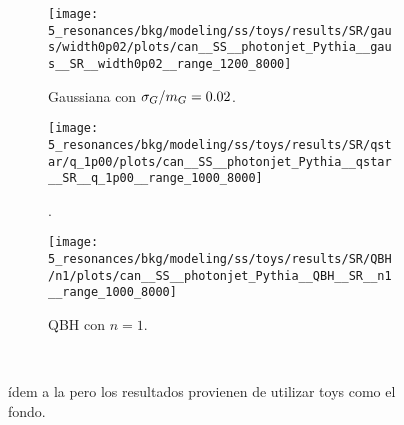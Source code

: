 \begin{figure}[ht!]
    \centering
    \begin{subfigure}[h]{0.32\linewidth}
        \centering
        \texttt{[image: 5\_resonances/bkg/modeling/ss/toys/results/SR/gaus/width0p02/plots/can\_\_SS\_\_photonjet\_Pythia\_\_gaus\_\_SR\_\_width0p02\_\_range\_1200\_8000]}
        \caption{Gaussiana con \(\sigma_G / m_{G} = 0.02\).}
    \end{subfigure}
    \hfill
    \begin{subfigure}[h]{0.32\linewidth}
        \centering
        \texttt{[image: 5\_resonances/bkg/modeling/ss/toys/results/SR/qstar/q\_1p00/plots/can\_\_SS\_\_photonjet\_Pythia\_\_qstar\_\_SR\_\_q\_1p00\_\_range\_1000\_8000]}
        \caption{\qstar.}
    \end{subfigure}
    \begin{subfigure}[h]{0.32\linewidth}
        \centering
        \texttt{[image: 5\_resonances/bkg/modeling/ss/toys/results/SR/QBH/n1/plots/can\_\_SS\_\_photonjet\_Pythia\_\_QBH\_\_SR\_\_n1\_\_range\_1000\_8000]}
        \caption{\ac{QBH} con \(n=1\).}
    \end{subfigure}\\
    \caption{ídem a la \Fig{\ref{fig:bkg_modeling:sstest_results_asimov_SR}} pero los resultados provienen de utilizar toys como el fondo.}
    \label{fig:bkg_modeling:sstest_results_toys_SR}
\end{figure}


